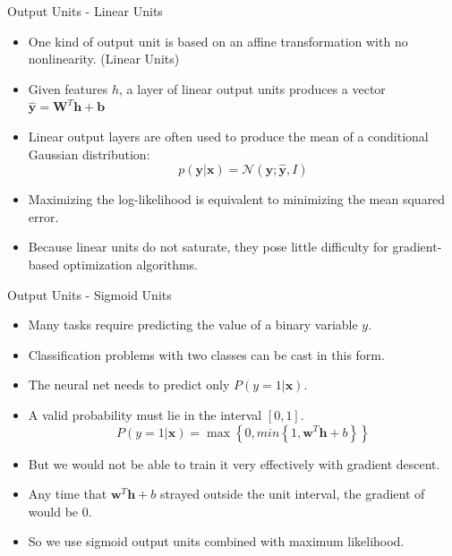 \documentclass[10pt]{beamer}
\begin{document}
	\begin{frame}{Output Units - Linear Units}
		\begin{itemize}
			\pause
			\item One kind of output unit is based on an affine transformation with no nonlinearity. (Linear Units)
			\pause
			\item Given features $h$, a layer of linear output units produces a vector $\hat{\bm{y}}=\bm{W}^T\bm{h}+\bm{b}$
			\pause
			\item Linear output layers are often used to produce the mean of a conditional Gaussian distribution:
			$$p(\bm{y}|\bm{x})=\mathcal{N}(\bm{y};\hat{\bm{y}},\mathit{I})$$

			\pause
			\item Maximizing the log-likelihood is equivalent to minimizing the mean squared error.
			\pause
			\item Because linear units do not saturate, they pose little difficulty for gradient-based optimization algorithms.
		\end{itemize}
	\end{frame}

	\begin{frame}{Output Units - Sigmoid Units}
		\begin{itemize}
			\pause
			\item Many tasks require predicting the value of a binary variable $y$.
			\item Classification problems with two classes can be cast in this form.
			\pause
			\item The neural net needs to predict only $P(y=1|\bm{x})$.
			\pause
			\item A valid probability must lie in the interval $[0, 1]$.
			$$P(y=1|\bm{x})=\max\left\{0,min\left\{1,\bm{w}^T\bm{h}+b\right\}\right\}$$

			\pause
			\item But we would not be able to train it very effectively with gradient descent.
			\item Any time that $\bm{w}^T\bm{h}+b$ strayed outside the unit interval, the gradient of would be 0.
			\pause
			\item So we use sigmoid output units combined with maximum likelihood.
		\end{itemize}
	\end{frame}
\end{document}
